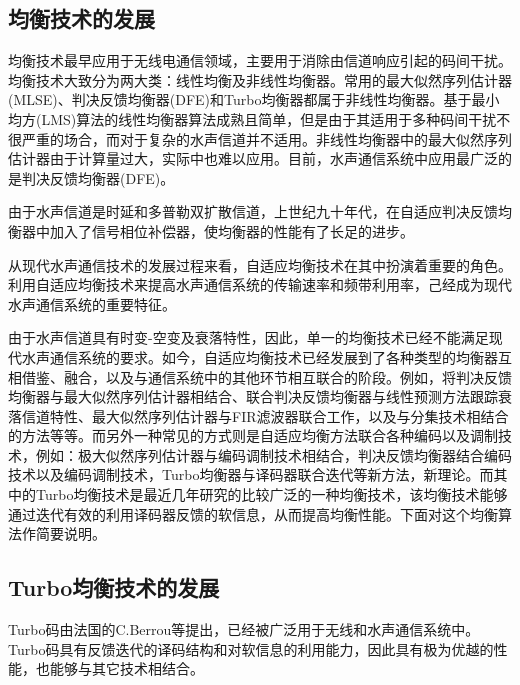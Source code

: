 \subsection{均衡技术的发展}
均衡技术最早应用于无线电通信领域，主要用于消除由信道响应引起的码间干扰。均衡技术大致分为两大类：线性均衡及非线性均衡器。常用的最大似然序列估计器(MLSE)、判决反馈均衡器(DFE)和Turbo均衡器都属于非线性均衡器。基于最小均方(LMS)算法的线性均衡器算法成熟且简单，但是由于其适用于多种码间干扰不很严重的场合，而对于复杂的水声信道并不适用。非线性均衡器中的最大似然序列估计器由于计算量过大，实际中也难以应用。目前，水声通信系统中应用最广泛的是判决反馈均衡器(DFE)。

由于水声信道是时延和多普勒双扩散信道，上世纪九十年代，在自适应判决反馈均衡器中加入了信号相位补偿器，使均衡器的性能有了长足的进步。

从现代水声通信技术的发展过程来看，自适应均衡技术在其中扮演着重要的角色。利用自适应均衡技术来提高水声通信系统的传输速率和频带利用率，己经成为现代水声通信系统的重要特征。

由于水声信道具有时变-空变及衰落特性，因此，单一的均衡技术已经不能满足现代水声通信系统的要求。如今，自适应均衡技术已经发展到了各种类型的均衡器互相借鉴、融合，以及与通信系统中的其他环节相互联合的阶段。例如，将判决反馈均衡器与最大似然序列估计器相结合\citep{LeNgoc1996}、联合判决反馈均衡器与线性预测方法跟踪衰落信道特性\citep{Blostein1995}、最大似然序列估计器与FIR滤波器联合工作\citep{Pasupathy1995}，以及与分集技术相结合的方法\citep{Taylor1995}等等。而另外一种常见的方式则是自适应均衡方法联合各种编码以及调制技术，例如：极大似然序列估计器与编码调制技术相结合\citep{stuber1997}\citep{Younis}，判决反馈均衡器结合编码技术以及编码调制技术\citep{Wang1996,Zhou1990,Yang2004}，Turbo均衡器与译码器联合迭代\citep{Magniez1999,Raphaeli1997,Vlahoyiannatos2001,Combined2000,Tuchler2002,Tuchler2011,Tuchler2002a,Xiang2003,Yang2007,Yang2005,Anastasopoulos1997,Hanzo2002,Ralf2004}等新方法，新理论。而其中的Turbo均衡技术是最近几年研究的比较广泛的一种均衡技术，该均衡技术能够通过迭代有效的利用译码器反馈的软信息，从而提高均衡性能。下面对这个均衡算法作简要说明。
\subsection{Turbo均衡技术的发展}
Turbo码由法国的C.Berrou\citep{berrou1993}等提出，已经被广泛用于无线和水声通信系统中。Turbo码具有反馈迭代的译码结构和对软信息的利用能力，因此具有极为优越的性能，也能够与其它技术相结合。

